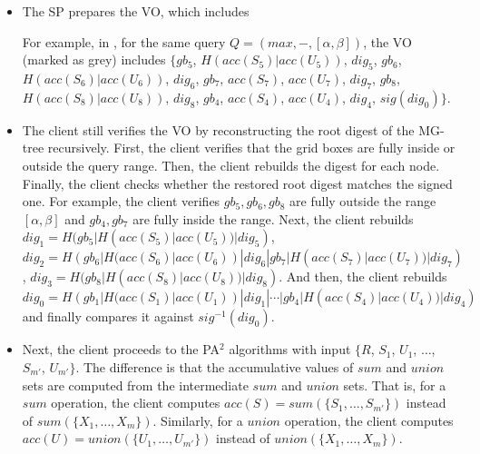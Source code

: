 \begin{itemize}
  \item The SP prepares the VO, which includes
    For example, in , for the same query $Q=(max, -, [\alpha, \beta])$, the VO (marked as grey) includes $\{gb_5$, $H(acc(S_5)|acc(U_5))$, $dig_5$, $gb_6$, $H(acc(S_6)|acc(U_6))$, $dig_6$, $gb_7$, $acc(S_7)$, $acc(U_7)$, $dig_7$, $gb_8$, $H(acc(S_8)|acc(U_8))$, $dig_8$, $gb_4$, $acc(S_4)$, $acc(U_4)$, $dig_4$, $sig(dig_0)\}$. %
  \item The client still verifies the VO by reconstructing the root digest of the MG-tree recursively. First, the client verifies that the grid boxes are fully inside or outside the query range. Then, the client rebuilds the digest for each node. Finally, the client checks whether the restored root digest matches the signed one. For example, the client verifies $gb_5, gb_6, gb_8$ are fully outside the range $[\alpha, \beta]$ and $gb_4, gb_7$ are fully inside the range. Next, the client rebuilds $dig_1 = H(gb_5 | H(acc(S_5)|acc(U_5)) | dig_5)$, $dig_2 = H(gb_6 | H(acc(S_6)|acc(U_6)) | dig_6 | gb_7 | H(acc(S_7)|acc(U_7)) | dig_7)$, $dig_3 = H(gb_8 | \allowbreak H(acc(S_8)|acc(U_8)) | dig_8)$. And then, the client rebuilds $dig_0 = H(gb_1 | \allowbreak H(acc(S_1)|acc(U_1)) | dig_1 | \cdots | gb_4 | H(acc(S_4)|acc(U_4)) | dig_4)$ and finally compares it against $sig^{-1}(dig_0)$.
  \item Next, the client proceeds to the PA$^2$ algorithms with input $\{R$, $S_1$, $U_1$, $\dots$, $S_{m'}$, $U_{m'}\}$. The difference is that the accumulative values of $sum$ and $union$ sets are computed from the intermediate $sum$ and $union$ sets. That is, for a $sum$ operation, the client computes $acc(S) = sum(\{S_1, \dots, S_{m'}\})$ instead of $sum(\{X_1, \dots, X_m\})$. Similarly, for a $union$ operation, the client computes $acc(U) = union(\{U_1, \dots, U_{m'}\})$ instead of $union(\{X_1, \dots, X_m\})$.
\end{itemize}

